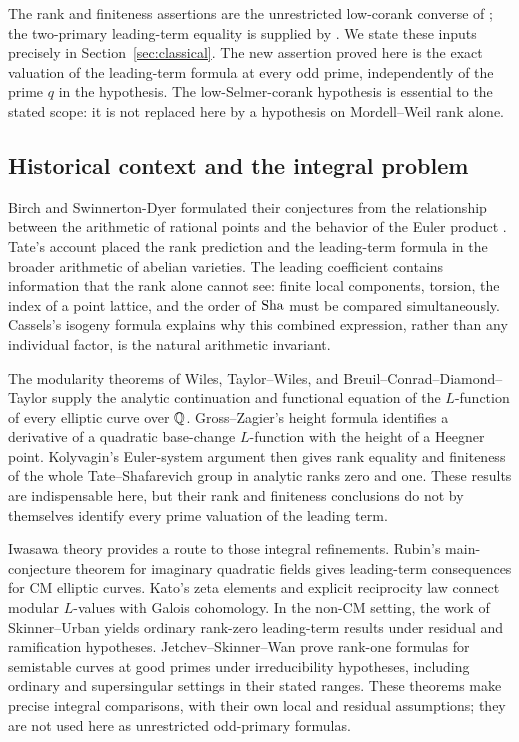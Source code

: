 The rank and finiteness assertions are the unrestricted low-corank
converse of \cite{C}; the two-primary leading-term equality is supplied
by \cite{B}. We state these inputs precisely in
Section~\ref{sec:classical}. The new assertion proved here is the exact
valuation of the leading-term formula at every odd prime, independently
of the prime $q$ in the hypothesis. The low-Selmer-corank hypothesis is
essential to the stated scope: it is not replaced here by a hypothesis
on Mordell--Weil rank alone.

\subsection{Historical context and the integral problem}

Birch and Swinnerton-Dyer formulated their conjectures from the
relationship between the arithmetic of rational points and the behavior
of the Euler product \cite{BirchSwinnertonDyer}. Tate's account
\cite{TateBSD} placed the rank prediction and the leading-term formula
in the broader arithmetic of abelian varieties. The leading coefficient
contains information that the rank alone cannot see: finite local
components, torsion, the index of a point lattice, and the order of
\(\operatorname{Sha}\) must be compared simultaneously. Cassels's isogeny formula
\cite{Cassels} explains why this combined expression, rather than any
individual factor, is the natural arithmetic invariant.

The modularity theorems of Wiles, Taylor--Wiles, and
Breuil--Conrad--Diamond--Taylor
\cite{Wiles,TaylorWiles,BCDT} supply the analytic continuation and
functional equation of the \(L\)-function of every elliptic curve over
\(\mathbb Q\). Gross--Zagier's height formula \cite{GrossZagier} identifies
a derivative of a quadratic base-change \(L\)-function with the height
of a Heegner point. Kolyvagin's Euler-system argument
\cite{Kolyvagin} then gives rank equality and finiteness of the whole
Tate--Shafarevich group in analytic ranks zero and one. These results
are indispensable here, but their rank and finiteness conclusions do
not by themselves identify every prime valuation of the leading term.

Iwasawa theory provides a route to those integral refinements.
Rubin's main-conjecture theorem for imaginary quadratic fields
\cite{Rubin} gives leading-term consequences for CM elliptic curves.
Kato's zeta elements and explicit reciprocity law \cite{Kato}
connect modular \(L\)-values with Galois cohomology. In the non-CM
setting, the work of Skinner--Urban \cite{SkinnerUrban} yields
ordinary rank-zero leading-term results under residual and
ramification hypotheses. Jetchev--Skinner--Wan
\cite{JetchevSkinnerWan} prove rank-one formulas for semistable
curves at good primes under irreducibility hypotheses, including
ordinary and supersingular settings in their stated ranges.
These theorems make precise integral comparisons, with their own
local and residual assumptions; they are not used here as
unrestricted odd-primary formulas.

